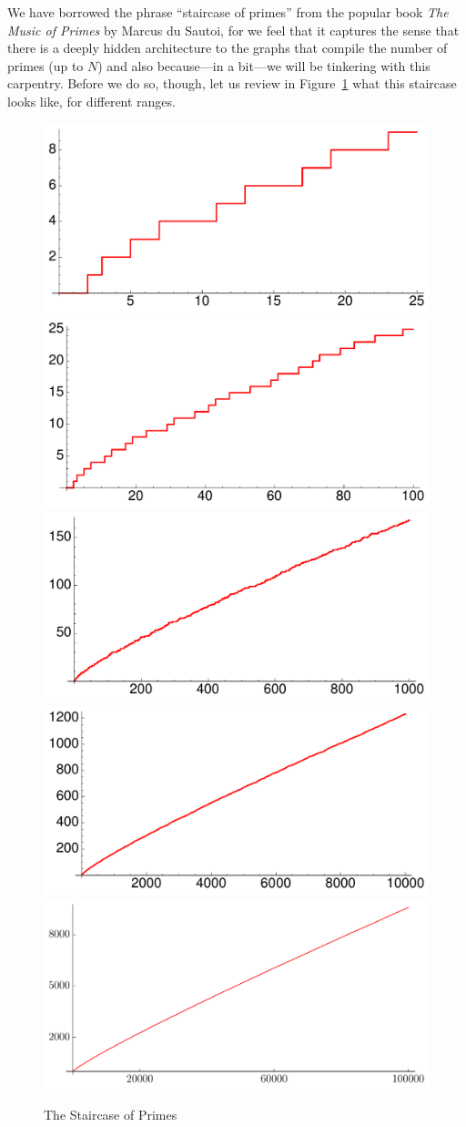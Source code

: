 \documentclass[11pt]{article}
\theoremstyle{plain}
\theoremstyle{definition}
\numberwithin{equation}{section}
\numberwithin{figure}{section}
\numberwithin{table}{section}
\begin{document}
\bigskip

We have borrowed the phrase ``staircase of primes'' from the popular
book {\em The Music of Primes} by Marcus du Sautoi, for we feel that
it captures the sense that there is a deeply hidden architecture to
the graphs that compile the number of primes (up to $N$) and also
because---in a bit---we will be tinkering with this carpentry.  Before
we do so, though, let us review in Figure~\ref{fig:staircases}
what this staircase looks like, for
different ranges.

\begin{figure}
\begin{center}
\includegraphics[width=.4\textwidth]{illustrations/PN_25} 
\includegraphics[width=.4\textwidth]{illustrations/PN_100}\\ 

\includegraphics[width=.4\textwidth]{illustrations/PN_1000}
\includegraphics[width=.4\textwidth]{illustrations/PN_10000}\\ 

\includegraphics[width=.6\textwidth]{illustrations/PN_100000}
\end{center}
\caption{The Staircase of Primes\label{fig:staircases}}
\end{figure}
\end{document}
